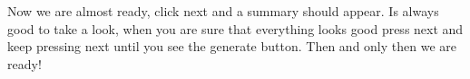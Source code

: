 Now we are almost ready, click next and a summary should appear. Is always good to take a look, when you are sure that everything looks good press next and keep pressing next until you see the generate button. Then and only then we are ready!

















































